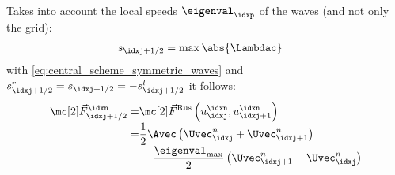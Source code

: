 \begin{defnbox}\nospacing
    \begin{defn}\label{defn:Rusanov_local_friedrichs_scheme_system}\leavevmode\\
        Takes into account the local speeds $\eigenval_{\idxp}$ of the waves (and not only the grid):
        \begin{align}
          s_{\idxj+1/2}=\max\abs{\Lambdac}&&
        \end{align}
        with \cref{eq:central_scheme_symmetric_waves} and $s_{\idxj+1/2}^{r}=s_{\idxj+1/2}=-s_{\idxj+1/2}^{l}$ it follows:
        \begin{align}
          \Fluxvec_{\idxj+1/2}^{\idxn}=&\Fluxvec^{\text{Rus}}\left(u^{\idxn}_{\idxj},u^{\idxn}_{\idxj+1}\right)\\[-1\jot]
                                   =&\frac{1}{2}\Avec \left(\Uvec_{\idxj}^{n}+\Uvec_{\idxj+1}^{n}\right)\\[-1\jot]
          &-\frac{\eigenval_{\max}}{2}\left(\Uvec_{\idxj+1}^{n}-\Uvec_{\idxj}^{n}\right)\nonumber
        \end{align}
    \end{defn}
\end{defnbox}
